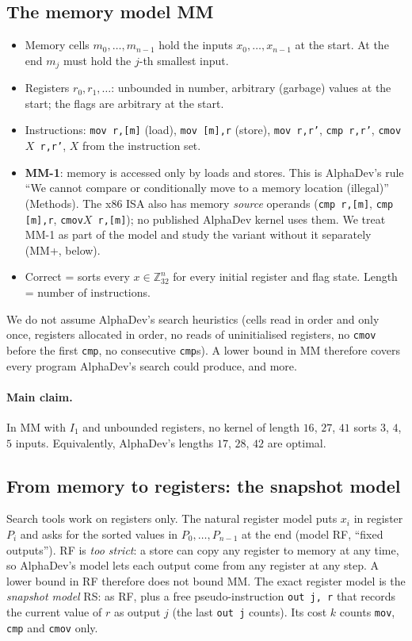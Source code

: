 \subsection{The memory model MM}
\begin{itemize}
\item Memory cells $m_0, \dots, m_{n-1}$ hold the inputs $x_0, \dots, x_{n-1}$ at the start. At the end $m_j$ must hold the
$j$-th smallest input.
\item Registers $r_0, r_1, \dots$: unbounded in number, arbitrary (garbage) values at the start; the flags are arbitrary at the
start.
\item Instructions: \texttt{mov r,[m]} (load), \texttt{mov [m],r} (store), \texttt{mov r,r'}, \texttt{cmp r,r'},
\texttt{cmov}$X$\texttt{ r,r'}, $X$ from the instruction set.
\item \textbf{MM-1}: memory is accessed only by loads and stores. This is AlphaDev's rule ``We cannot compare or conditionally
move to a memory location (illegal)'' (Methods). The x86 ISA also has memory \emph{source} operands (\texttt{cmp r,[m]},
\texttt{cmp [m],r}, \texttt{cmov}$X$\texttt{ r,[m]}); no published AlphaDev kernel uses them. We treat MM-1 as part of the
model and study the variant without it separately (MM+, below).
\item Correct = sorts every $x \in \mathbb{Z}_{32}^n$ for every initial register and flag state. Length = number of
instructions.
\end{itemize}
We do not assume AlphaDev's search heuristics (cells read in order and only once, registers allocated in order, no reads of
uninitialised registers, no \texttt{cmov} before the first \texttt{cmp}, no consecutive \texttt{cmp}s). A lower bound in MM
therefore covers every program AlphaDev's search could produce, and more.

\paragraph{Main claim.} In MM with $I_1$ and unbounded registers, no kernel of length $16$, $27$, $41$ sorts $3$, $4$, $5$
inputs. Equivalently, AlphaDev's lengths $17$, $28$, $42$ are optimal. \pending

\subsection{From memory to registers: the snapshot model}
Search tools work on registers only. The natural register model puts $x_i$ in register $P_i$ and asks for the sorted values
in $P_0, \dots, P_{n-1}$ at the end (model RF, ``fixed outputs''). RF is \emph{too strict}: a store can copy any register to
memory at any time, so AlphaDev's model lets each output come from any register at any step. A lower bound in RF therefore
does not bound MM. The exact register model is the \emph{snapshot model} RS: as RF, plus a free pseudo-instruction
\texttt{out j, r} that records the current value of $r$ as output $j$ (the last \texttt{out j} counts). Its cost $k$ counts
\texttt{mov}, \texttt{cmp} and \texttt{cmov} only.

